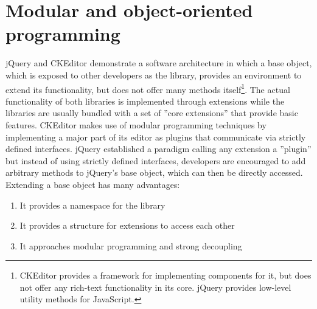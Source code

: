 




\section{Modular and object-oriented programming}
\label{subsec:modular_and_oop}

jQuery and CKEditor demonstrate a software architecture in which a base object, which is exposed to other developers as the library, provides an environment to extend its functionality, but does not offer many methods itself\footnote{CKEditor provides a framework for implementing components for it, but does not offer any rich-text functionality in its core. jQuery provides low-level utility methods for JavaScript.}. The actual functionality of both libraries is implemented through extensions while the libraries are usually bundled with a set of ''core extensions'' that provide basic features. CKEditor makes use of modular programming techniques by implementing a major part of its editor as plugins that communicate via strictly defined interfaces. jQuery established a paradigm calling any extension a ''plugin'' but instead of using strictly defined interfaces, developers are encouraged to add arbitrary methods to jQuery's base object, which can then be directly accessed. Extending a base object has many advantages:

\begin{enumerate}
\item It provides a namespace for the library
\item It provides a structure for extensions to access each other
\item It approaches modular programming and strong decoupling
\end{enumerate}

